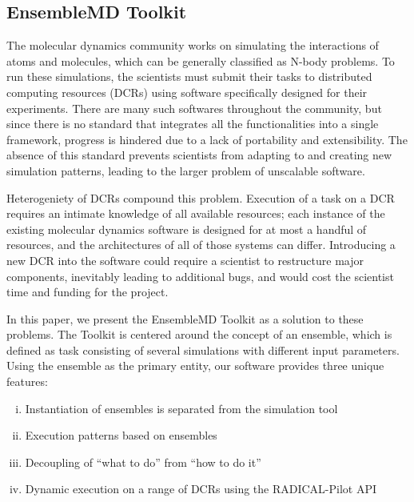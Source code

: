 \documentclass[conference]{IEEEtran}
\begin{document}
\subsection{EnsembleMD Toolkit}
  
The molecular dynamics community works on simulating the interactions of atoms and molecules, which can be generally classified as N-body problems. To run these simulations, the scientists must submit their tasks to distributed computing resources (DCRs) using software specifically designed for their experiments. There are many such softwares throughout the community, but since there is no standard that integrates all the functionalities into a single framework, progress is hindered due to a lack of portability and extensibility. The absence of this standard prevents scientists from adapting to and creating new simulation patterns, leading to the larger problem of unscalable software. 

Heterogeniety of DCRs compound this problem. Execution of a task on a DCR requires an intimate knowledge of all available resources; each instance of the existing molecular dynamics software is designed for at most a handful of resources, and the architectures of all of those systems can differ. Introducing a new DCR into the software could require a scientist to restructure major components, inevitably leading to additional bugs, and would cost the scientist time and funding for the project. 

In this paper, we present the EnsembleMD Toolkit as a solution to these problems. The Toolkit is centered around the concept of an ensemble, which is defined as task consisting of several simulations with different input parameters. Using the ensemble as the primary entity, our software provides three unique features:
\begin{enumerate}[(i)]
  \item Instantiation of ensembles is separated from the simulation tool
  \item Execution patterns based on ensembles
  \item Decoupling of ``what to do'' from ``how to do it''
  \item Dynamic execution on a range of DCRs using the RADICAL-Pilot API
\end{enumerate}

\end{document}
